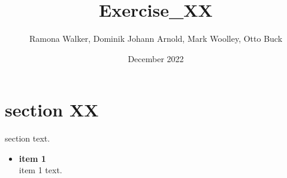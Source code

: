 \documentclass{article}
\title{Exercise\_XX}
\author{Ramona Walker, Dominik Johann Arnold, Mark Woolley, Otto Buck}
\date{December 2022}
\begin{document}
\maketitle
\newpage

\section{section XX}
section text. \\

\begin{itemize}
    \item \textbf{item 1}\\
    item 1 text.\\
\end{itemize}


\newpage
\end{document}
